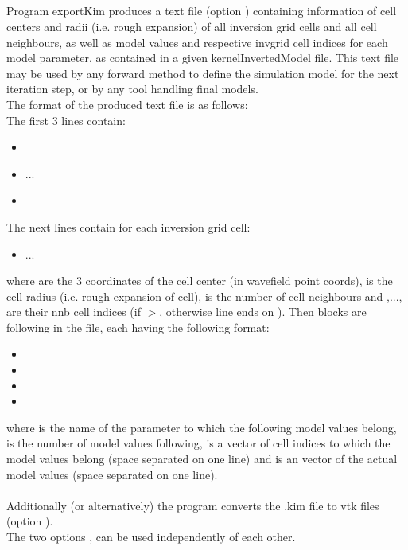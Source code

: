 \subsection{} \label{programs_scripts,sec:bin_prog,sec:exp_Kim}
Program exportKim produces a text file (option ) containing information of cell centers and radii (i.e. rough expansion) of all inversion grid cells and all cell neighbours, as well as model values and respective invgrid cell indices for each model parameter, as contained in a given kernelInvertedModel file. This text file may be used by any forward method to define the simulation model for the next iteration step, or by any tool handling final models.\\
The format of the produced text file is as follows:\\
The first 3 lines contain:
\begin{itemize}
\item[]
\item[]   ... 
\item[]
\end{itemize}
The next  lines contain for each inversion grid cell:
\begin{itemize}
\item[] ... 
\end{itemize} 
where  are the 3 coordinates of the cell center (in wavefield point coords),  is the cell radius (i.e. rough expansion of cell),  is the number of cell neighbours and ,..., are their nnb cell indices (if \(>\), otherwise line ends on ). Then  blocks are following in the file, each having the following format:
\begin{itemize}
\item[]
\item[]
\item[]
\item[]
\end{itemize}
where  is the name of the parameter to which the following model values belong,  is the number of model values following,  is a vector of  cell indices to which the model values belong (space separated on one line) and  is an vector of the actual  model values (space separated on one line).\\
\\
Additionally (or alternatively) the program converts the .kim file to vtk files (option ).\\
The two options  ,  can be used independently of each other.
